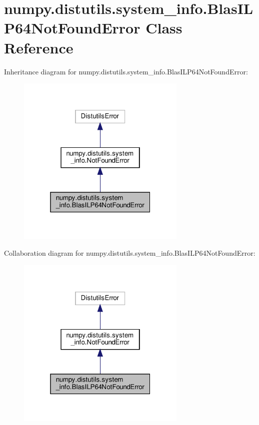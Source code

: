 \hypertarget{classnumpy_1_1distutils_1_1system__info_1_1BlasILP64NotFoundError}{}\section{numpy.\+distutils.\+system\+\_\+info.\+Blas\+I\+L\+P64\+Not\+Found\+Error Class Reference}
\label{classnumpy_1_1distutils_1_1system__info_1_1BlasILP64NotFoundError}


Inheritance diagram for numpy.\+distutils.\+system\+\_\+info.\+Blas\+I\+L\+P64\+Not\+Found\+Error\+:
\nopagebreak
\begin{figure}[H]
\begin{center}
\leavevmode
\includegraphics[width=229pt]{classnumpy_1_1distutils_1_1system__info_1_1BlasILP64NotFoundError__inherit__graph}
\end{center}
\end{figure}


Collaboration diagram for numpy.\+distutils.\+system\+\_\+info.\+Blas\+I\+L\+P64\+Not\+Found\+Error\+:
\nopagebreak
\begin{figure}[H]
\begin{center}
\leavevmode
\includegraphics[width=229pt]{classnumpy_1_1distutils_1_1system__info_1_1BlasILP64NotFoundError__coll__graph}
\end{center}
\end{figure}


